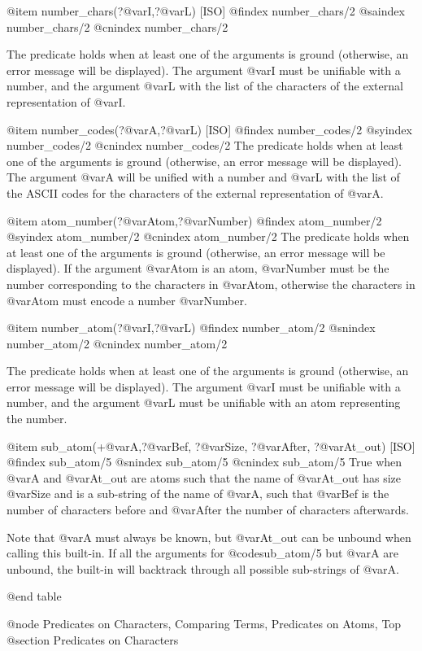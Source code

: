 {{{{@item number_chars(?@var{I},?@var{L}) [ISO]
@findex number_chars/2
@saindex number_chars/2
@cnindex number_chars/2

The predicate holds when at least one of the arguments is ground
(otherwise, an error message will be displayed). The argument @var{I} must
be unifiable with a number, and the argument @var{L} with the list of the
characters of the external representation of @var{I}.

@item number_codes(?@var{A},?@var{L}) [ISO]
@findex number_codes/2
@syindex number_codes/2
@cnindex number_codes/2
The predicate holds when at least one of the arguments is ground
(otherwise, an error message will be displayed). The argument @var{A}
will be unified with a number and @var{L} with the list of the ASCII
codes for the characters of the external representation of @var{A}.

@item atom_number(?@var{Atom},?@var{Number})
@findex atom_number/2
@syindex atom_number/2
@cnindex atom_number/2
The predicate holds when at least one of the arguments is ground
(otherwise, an error message will be displayed). If the argument
@var{Atom} is an atom, @var{Number} must be the number corresponding
to the characters in @var{Atom}, otherwise the characters in
@var{Atom} must encode a number @var{Number}.

@item number_atom(?@var{I},?@var{L})
@findex number_atom/2
@snindex number_atom/2
@cnindex number_atom/2

The predicate holds when at least one of the arguments is ground
(otherwise, an error message will be displayed). The argument @var{I} must
be unifiable with a number, and the argument @var{L} must be unifiable
with an atom representing the number.

@item sub_atom(+@var{A},?@var{Bef}, ?@var{Size}, ?@var{After}, ?@var{At_out}) [ISO]
@findex sub_atom/5
@snindex sub_atom/5
@cnindex sub_atom/5
True when @var{A} and @var{At_out} are atoms such that the name of
@var{At_out} has size @var{Size} and is a sub-string of the name of
@var{A}, such that @var{Bef} is the number of characters before and
@var{After} the number of characters afterwards.

Note that @var{A} must always be known, but @var{At_out} can be unbound when
calling this built-in. If all the arguments for @code{sub_atom/5} but @var{A}
are unbound, the built-in will backtrack through all possible
sub-strings of @var{A}.

@end table

@node Predicates on Characters, Comparing Terms, Predicates on Atoms, Top
@section Predicates on Characters

}}}}
